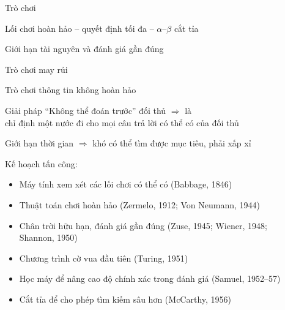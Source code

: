 \documentclass{article}
\begin{document}
\begin{huge}

\sf


\blob Trò chơi

\blob Lối chơi hoàn hảo\nl
-- quyết định tối đa \nl
-- $\alpha$--$\beta$ cắt tỉa

\blob Giới hạn tài nguyên và đánh giá gần đúng

\blob Trò chơi may rủi

\blob Trò chơi thông tin không hoàn hảo



Giải pháp ``Không thể đoán trước'' đối thủ $\Rightarrow$ là \\
chỉ định một nước đi cho mọi câu trả lời có thể có của đối thủ

Giới hạn thời gian $\Rightarrow$ khó có thể tìm được mục tiêu, phải xấp xỉ

Kế hoạch tấn công:
\begin{itemize}
\item Máy tính xem xét các lối chơi có thể có (Babbage, 1846)
\item Thuật toán chơi hoàn hảo (Zermelo, 1912; Von Neumann, 1944)
\item Chân trời hữu hạn, đánh giá gần đúng (Zuse, 1945; Wiener, 1948; \\
      Shannon, 1950)
\item Chương trình cờ vua đầu tiên (Turing, 1951)
\item Học máy để nâng cao độ chính xác trong đánh giá (Samuel, 1952--57)
\item Cắt tỉa để cho phép tìm kiếm sâu hơn (McCarthy, 1956)
\end{itemize}



\vspace*{0.3in}

\textwidth
{}







\end{huge}
\end{document}
